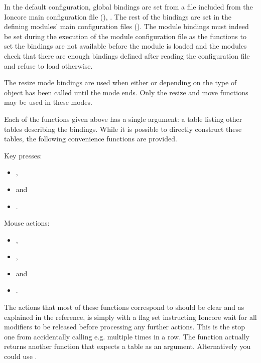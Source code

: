 In the default configuration, global bindings are set from a file
included from the Ioncore main configuration file (),
.
The rest of the bindings are set in the defining modules' main
configuration files (). The module bindings
must indeed be set during the execution of the module configuration
file as the functions to set the bindings are not available before
the module is loaded and the modules check that there are enough
bindings defined after reading the configuration file and
refuse to load otherwise.

The resize mode bindings are used when either
 or  
depending on the type of object has been called until the mode
ends. Only the resize and move functions may be used in these modes.

Each of the functions given above has a single argument: a table
listing other tables describing the bindings. While it is possible
to directly construct these tables, the following convenience
functions are provided. 

Key presses:
\begin{itemize}
    \item {},
    \item {} and
    \item {}.
\end{itemize}
Mouse actions:
\begin{itemize}
    \item {},
    \item {}, 
    \item {} and
    \item {}.
\end{itemize}

The actions that most of these functions correspond to should be clear
and as explained in the reference,  is simply
 with a flag set instructing Ioncore wait for all
modifiers to be released before processing any further actions.
This is the stop one from accidentally calling e.g.
 multiple times in a row. The 
function actually returns another function that expects a table
as an argument. Alternatively you could use
.

